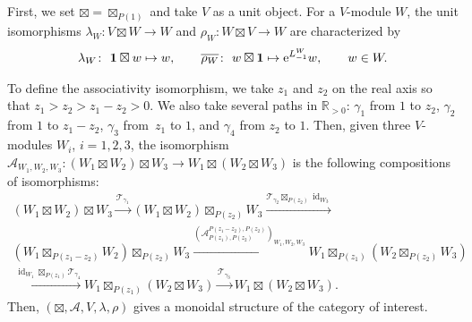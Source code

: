\documentclass[pdftex]{sigma}
\numberwithin{equation}{section}
\newcommand{\ol}[1]{\overline{#1}}
\newcommand{\id}{\operatorname{id}}
\newcommand{\bR}{\mathbb{R}}
\newcommand{\cA}{\mathcal{A}}
\newcommand{\cT}{\mathcal{T}}
\newcommand{\voagen}{V}
\newcommand{\voamodgen}{W}
\newcommand{\voavac}{\mathbf{1}}
\newcommand{\vmodvec}{w}
\begin{document}
First, we set $\boxtimes=\boxtimes_{P(1)}$ and take $\voagen$ as a unit object.
For a $\voagen$-module $\voamodgen$, the unit isomorphisms $\lambda_{\voamodgen}\colon \voagen\boxtimes\voamodgen\to\voamodgen$ and $\rho_{\voamodgen}\colon\voamodgen\boxtimes \voagen\to \voamodgen$ are characterized by
\begin{gather*}
 \lambda_{\voamodgen}\colon\ \voavac\boxtimes \vmodvec\mapsto \vmodvec,\qquad \ol{\rho_{\voamodgen}}\colon\ \vmodvec\boxtimes\voavac\mapsto {\rm e}^{L^{\voamodgen}_{-1}}\vmodvec,\qquad \vmodvec\in\voamodgen.
\end{gather*}

To define the associativity isomorphism, we take $z_{1}$ and $z_{2}$ on the real axis so that $z_{1}>z_{2}>z_{1}-z_{2}>0$.
We also take several paths in $\bR_{>0}$: $\gamma_{1}$ from $1$ to $z_{2}$, $\gamma_{2}$ from $1$ to $z_{1}-z_{2}$, $\gamma_{3}$ from~$z_{1}$ to $1$, and $\gamma_{4}$ from $z_{2}$ to $1$.
Then, given three $\voagen$-modules $\voamodgen_{i}$, $i=1,2,3$, the isomorphism $\cA_{\voamodgen_{1},\voamodgen_{2},\voamodgen_{3}}\colon (\voamodgen_{1}\boxtimes \voamodgen_{2})\boxtimes \voamodgen_{3}\to \voamodgen_{1}\boxtimes (\voamodgen_{2}\boxtimes \voamodgen_{3})$ is the following compositions of isomorphisms:
\begin{gather*}
 (\voamodgen_{1}\boxtimes \voamodgen_{2})\boxtimes \voamodgen_{3}
 \xrightarrow{\cT_{\gamma_{1}}}
 (\voamodgen_{1}\boxtimes \voamodgen_{2})\boxtimes_{P(z_{2})} \voamodgen_{3}
 \xrightarrow{\cT_{\gamma_{2}}\boxtimes_{P(z_{2})}\id_{\voamodgen_{3}}} \\
 (\voamodgen_{1}\boxtimes_{P(z_{1}-z_{2})} \voamodgen_{2})\boxtimes_{P(z_{2})} \voamodgen_{3}
 \xrightarrow{(\cA_{P(z_{1}),P(z_{2})}^{P(z_{1}-z_{2}),P(z_{2})})_{\voamodgen_{1},\voamodgen_{2},\voamodgen_{3}}}
 \voamodgen_{1}\boxtimes_{P(z_{1})} (\voamodgen_{2}\boxtimes_{P(z_{2})} \voamodgen_{3}) \\
 \xrightarrow{\id_{\voamodgen_{1}}\boxtimes_{P(z_{1})}\cT_{\gamma_{4}}}
 \voamodgen_{1}\boxtimes_{P(z_{1})} (\voamodgen_{2}\boxtimes \voamodgen_{3})
 \xrightarrow{\cT_{\gamma_{3}}}
 \voamodgen_{1}\boxtimes (\voamodgen_{2}\boxtimes \voamodgen_{3}).
\end{gather*}
Then, $(\boxtimes, \cA, \voagen, \lambda,\rho)$ gives a monoidal structure of the category of interest.
\end{document}
